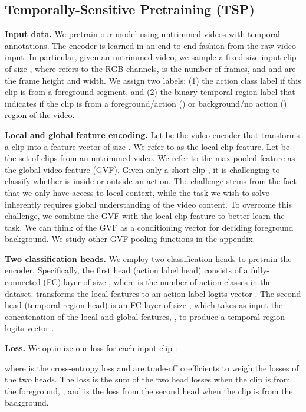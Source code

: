 \documentclass[10pt,twocolumn,letterpaper]{article}
\begin{document}
\subsection{Temporally-Sensitive Pretraining (TSP)}

\noindent\textbf{Input data.}
We pretrain our model using untrimmed videos with temporal annotations. The encoder is learned in an end-to-end fashion from the raw video input. In particular, given an untrimmed video, we sample a fixed-size input clip  of size , where  refers to the RGB channels,  is the number of frames, and  and  are the frame height and width. We assign  two labels: (1) the action class label  if this clip is from a foreground segment, and (2) the binary temporal region label  that indicates if the clip is from a foreground/action () or background/no action () region of the video. 

\vspace{3pt}\noindent\textbf{Local and global feature encoding.}
Let  be the video encoder that transforms a clip  into a feature vector  of size . We refer to  as the local clip feature. 
Let  be the set of clips from an untrimmed video. We refer to the max-pooled feature  as the global video feature (GVF). 
Given only a short clip , it is challenging to classify whether  is inside or outside an action. The challenge stems from the fact that we only have access to local context, while the task we wish to solve inherently requires global understanding of the video content. To overcome this challenge, we combine the GVF with the local clip feature to better learn the task. We can think of the GVF as a conditioning vector for deciding foreground \vs background. 
We study other GVF pooling functions in the appendix.

\vspace{3pt}\noindent\textbf{Two classification heads.}
We employ two classification heads to pretrain the encoder. Specifically, the first head (action label head) consists of a fully-connected (FC) layer  of size , where  is the number of action classes in the dataset.  transforms the local features  to an action label logits vector . The second head (temporal region head) is an FC layer  of size , which takes as input the concatenation of the local and global features, , to produce a temporal region logits vector . 


\vspace{3pt}\noindent\textbf{Loss.} 
We optimize our loss for each input clip :

\noindent where  is the cross-entropy loss and  are trade-off coefficients to weigh the losses of the two heads. The loss is the sum of the two head losses when the clip is from the foreground, \ie , and is the loss from the second head when the clip is from the background. 
\end{document}
